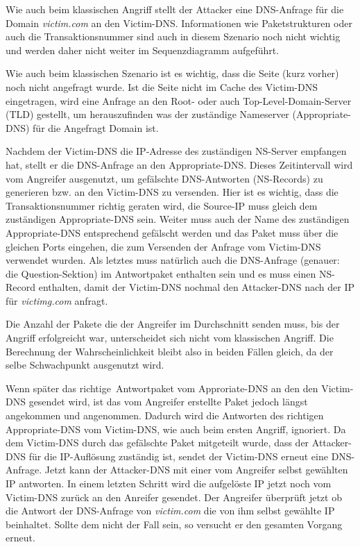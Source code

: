 \documentclass[10pt,a4paper]{article}
\begin{document}
Wie auch beim klassischen Angriff stellt der Attacker eine DNS-Anfrage für die Domain \emph{victim.com} an den Victim-DNS. Informationen wie Paketstrukturen oder auch die Transaktionsnummer sind auch in diesem Szenario noch nicht wichtig und werden daher nicht weiter im Sequenzdiagramm aufgeführt.

Wie auch beim klassischen Szenario ist es wichtig, dass die Seite (kurz vorher) noch nicht angefragt wurde. Ist die Seite nicht im Cache des Victim-DNS eingetragen, wird eine Anfrage an den Root- oder auch Top-Level-Domain-Server (TLD) gestellt, um herauszufinden was der zuständige Nameserver (Appropriate-DNS) für die Angefragt Domain ist.

Nachdem der Victim-DNS die IP-Adresse des zuständigen NS-Server empfangen hat, stellt er die DNS-Anfrage an den Appropriate-DNS. Dieses Zeitintervall wird vom Angreifer ausgenutzt, um gefälschte DNS-Antworten (NS-Records) zu generieren bzw. an den Victim-DNS zu versenden. Hier ist es wichtig, dass die Transaktionsnummer richtig geraten wird, die Source-IP muss gleich dem zuständigen Appropriate-DNS sein. Weiter muss auch der Name des zuständigen Appropriate-DNS entsprechend gefälscht werden und das Paket muss über die gleichen Ports eingehen, die zum Versenden der Anfrage vom Victim-DNS verwendet wurden. Als letztes muss natürlich auch die DNS-Anfrage (genauer: die Question-Sektion) im Antwortpaket enthalten sein und es muss einen NS-Record enthalten, damit der Victim-DNS nochmal den Attacker-DNS nach der IP für \emph{victimg.com} anfragt.

Die Anzahl der Pakete die der Angreifer im Durchschnitt senden muss, bis der Angriff erfolgreicht war, unterscheidet sich nicht vom klassischen Angriff. Die Berechnung der Wahrscheinlichkeit bleibt also in beiden Fällen gleich, da der selbe Schwachpunkt ausgenutzt wird.

Wenn später das \glqq richtige\grqq\ Antwortpaket vom Approriate-DNS an den den Victim-DNS gesendet wird, ist das vom Angreifer erstellte Paket jedoch längst angekommen und angenommen. Dadurch wird die Antworten des richtigen Appropriate-DNS vom Victim-DNS, wie auch beim ersten Angriff, ignoriert. Da dem Victim-DNS durch das gefälschte Paket mitgeteilt wurde, dass der Attacker-DNS für die IP-Auflösung zuständig ist, sendet der Victim-DNS erneut eine DNS-Anfrage. Jetzt kann der Attacker-DNS mit einer vom Angreifer selbst gewählten IP antworten. In einem letzten Schritt wird die aufgelöste IP jetzt noch vom Victim-DNS zurück an den Anreifer gesendet. Der Angreifer überprüft jetzt ob die Antwort der DNS-Anfrage von \emph{victim.com} die von ihm selbst gewählte IP beinhaltet. Sollte dem nicht der Fall sein, so versucht er den gesamten Vorgang erneut.
\end{document}
